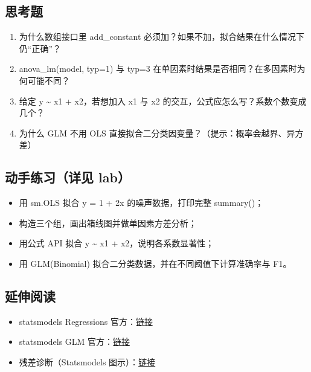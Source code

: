 \subsection{思考题}\label{ux601dux8003ux9898-22}

\begin{enumerate}
\def\labelenumi{\arabic{enumi}.}
\tightlist
\item
  为什么数组接口里 add\_constant
  必须加？如果不加，拟合结果在什么情况下仍``正确''？
\item
  anova\_lm(model, typ=1) 与 typ=3
  在单因素时结果是否相同？在多因素时为何可能不同？
\item
  给定 y \textasciitilde{} x1 + x2，若想加入 x1 与 x2
  的交互，公式应怎么写？系数个数变成几个？
\item
  为什么 GLM 不用 OLS 直接拟合二分类因变量？（提示：概率会越界、异方差）
\end{enumerate}

\subsection{动手练习（详见
lab）}\label{ux52a8ux624bux7ec3ux4e60ux8be6ux89c1-lab-14}

\begin{itemize}
\tightlist
\item
  用 sm.OLS 拟合 y = 1 + 2x 的噪声数据，打印完整 summary()；
\item
  构造三个组，画出箱线图并做单因素方差分析；
\item
  用公式 API 拟合 y \textasciitilde{} x1 + x2，说明各系数显著性；
\item
  用 GLM(Binomial) 拟合二分类数据，并在不同阈值下计算准确率与 F1。
\end{itemize}

\subsection{延伸阅读}\label{ux5ef6ux4f38ux9605ux8bfb-31}

\begin{itemize}
\tightlist
\item
  statsmodels Regressions
  官方：\href{https://www.statsmodels.org/stable/regression.html}{链接}
\item
  statsmodels GLM
  官方：\href{https://www.statsmodels.org/stable/glm.html}{链接}
\item
  残差诊断（Statsmodels
  图示）：\href{https://www.statsmodels.org/stable/examples/index.html\#regression}{链接}
\end{itemize}

